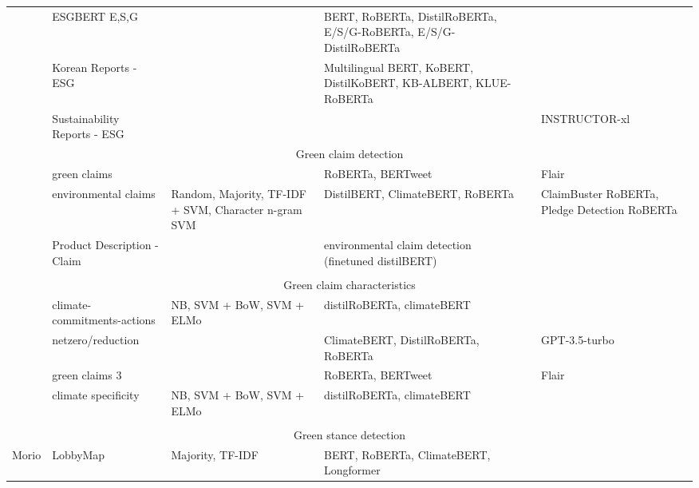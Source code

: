 \begin{longtable}[c]{lp{3cm}p{1.5cm}p{3cm}p{1.5cm}p{3cm}}
    \citet{schimanski_bridging_2023} & \raggedright ESGBERT E,S,G &   & \raggedright BERT, RoBERTa, DistilRoBERTa, E/S/G-RoBERTa,  E/S/G-DistilRoBERTa &  &  \\

    \citet{LEE2023119726} & \raggedright Korean Reports - ESG &   & \raggedright Multilingual BERT, KoBERT, DistilKoBERT, KB-ALBERT, KLUE-RoBERTa &  &  \\

    \citet{bronzini_glitter_2023} & \raggedright Sustainability Reports  - ESG &   &  &  & INSTRUCTOR-xl \\

    \multicolumn{6}{c}{Green claim detection} \\
    \midrule
    \citet{vinicius_woloszyn_towards_2021} & \raggedright green claims &   & RoBERTa, BERTweet &  & Flair \\

    \citet{stammbach_environmental_2023} & \raggedright environmental claims & \raggedright {\tiny Random, Majority, TF-IDF + SVM, Character n-gram SVM} & DistilBERT, ClimateBERT, RoBERTa &  & ClaimBuster RoBERTa, Pledge Detection RoBERTa \\

    \citet{linSUSTAINABLESIGNALSijcai2023} & Product Description - Claim &   & environmental claim detection (finetuned distilBERT) &  &  \\
&&&&&\\
    \multicolumn{6}{c}{Green claim characteristics} \\
    \midrule
    \citet{bingler2023cheaptalkspecificitysentiment} & \raggedright climate-commitments-actions &  NB, SVM + BoW, SVM + ELMo & distilRoBERTa, climateBERT &  &  \\


    \citet{tobias_schimanski_climatebert-netzero_2023} & \raggedright netzero/reduction &   & ClimateBERT, DistilRoBERTa, RoBERTa  &  & GPT-3.5-turbo \\

    \citet{vinicius_woloszyn_towards_2021} & \raggedright green claims 3 &   & RoBERTa, BERTweet &  & Flair \\

    \citet{bingler2023cheaptalkspecificitysentiment} & \raggedright climate specificity &  NB, SVM + BoW, SVM + ELMo & distilRoBERTa, climateBERT &  &  \\
&&&&&\\
    \multicolumn{6}{c}{Green stance detection} \\
    \midrule
    Morio \cite{morio2023an} & \raggedright LobbyMap & Majority, TF-IDF & BERT, RoBERTa, ClimateBERT, Longformer &  &  \\


\end{longtable}
